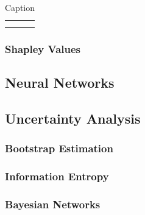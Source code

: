 \begin{table}[!htp]
    \centering
    \begin{tabular}{c|c}
         &  \\
         & 
    \end{tabular}
    \caption{Caption}
    \label{tab:xgb_tuning}
\end{table}

\subsubsection{Shapley Values}\label{ch5:xgb_shapley}

\subsection{Neural Networks}

\subsection{Uncertainty Analysis}

\subsubsection{Bootstrap Estimation}

\subsubsection{Information Entropy}

\subsubsection{Bayesian Networks}
